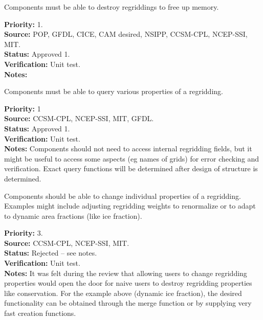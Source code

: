 
Components must be able to destroy regriddings to free up memory.

\begin{reqlist}
{\bf Priority:} 1. \\
{\bf Source:} POP, GFDL, CICE, CAM desired, NSIPP, CCSM-CPL, NCEP-SSI, MIT. \\
{\bf Status:} Approved 1. \\
{\bf Verification:} Unit test. \\
{\bf Notes:} 
\end{reqlist}


Components must be able to query various properties of a regridding.

\begin{reqlist}
{\bf Priority:} 1 \\
{\bf Source:} CCSM-CPL, NCEP-SSI, MIT, GFDL. \\
{\bf Status:} Approved 1. \\
{\bf Verification:} Unit test. \\
{\bf Notes:} Components should not need to access internal
             regridding fields, but it might be useful to access some
             aspects (eg names of grids) for error checking and verification.
             Exact query functions will be determined
             after design of structure is determined.
\end{reqlist}


Components should be able to change individual properties of a
regridding.  Examples might include adjusting regridding weights to 
renormalize or to adapt to dynamic area fractions (like ice fraction).

\begin{reqlist}
{\bf Priority:} 3. \\
{\bf Source:} CCSM-CPL, NCEP-SSI, MIT. \\
{\bf Status:} Rejected -- see notes. \\
{\bf Verification:} Unit test. \\
{\bf Notes:} It was felt during the review that allowing users to change
             regridding properties would open the door for naive users to 
             destroy regridding properties like conservation.  For the example
             above (dynamic ice fraction), the desired functionality can
             be obtained through the merge function or by supplying very fast
             creation functions.
\end{reqlist}

